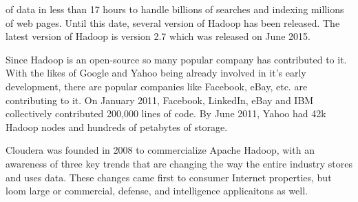 \documentclass[conference]{IEEEtran}
\begin{document}
of data in less than 17 hours to handle billions of searches and indexing millions of web pages.
Until this date, several version of Hadoop has been released. The latest version of Hadoop is version 2.7 which was released on June 2015.
\par Since Hadoop is an open-source so many popular company has contributed to it. With the likes of Google and Yahoo being already involved in it's early
development, there are popular companies like Facebook, eBay, etc. are contributing to it. On January 2011, Facebook, LinkedIn, eBay and IBM collectively contributed 200,000 lines of code. By June 2011, Yahoo had 
42k Hadoop nodes and hundreds of petabytes of storage.\cite{Wikiapache}
\par Cloudera was founded in 2008 to commercialize Apache Hadoop, with an awareness of three key trends that are changing the way the entire industry stores and uses data. These changes came first to consumer Internet properties, but loom large or commercial, defense, and
intelligence applicaitons as well.
\end{document}
